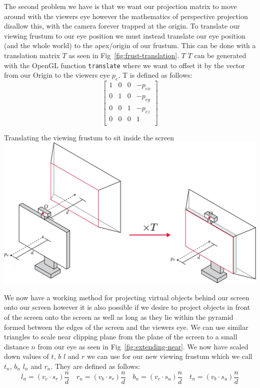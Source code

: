 The second problem we have is that we want our projection matrix to move around with the viewers eye however the mathematics of perspective projection disallow this, with the camera forever trapped at the origin. To translate our viewing frustum to our eye position we must instead translate our eye position (and the whole world) to the apex/origin of our frustum. This can be done with a translation matrix $T$ as seen in Fig~\ref{fig:frust-translation}. $T$ $T$ can be generated with the OpenGL function \texttt{translate} where we want to offset it by the vector from our Origin to the viewers eye $p_e$. T is defined as follows:
\[ 
\begin{bmatrix}
1 & 0 & 0 & -p_{ex} \\
0 & 1 & 0 & -p_{ey} \\
0 & 0 & 1 & -p_{ez} \\
0 & 0 & 0 & 1 \\
\end{bmatrix}
\]

\begin{figureBox}[label={fig:frust-translation}]{Translating the viewing frustum to sit inside the screen}
\includegraphics[width = 0.8\linewidth]{./figures/background/projection/frust-translation.pdf}
\end{figureBox}

We now have a working method for projecting virtual objects behind our screen onto our screen however it is also possible if we desire to project objects in front of the screen onto the screen as well as long as they lie within the pyramid formed between the edges of the screen and the viewers eye. We can use similar triangles to scale near clipping plane from the plane of the screen to a small distance $n$ from our eye as seen in Fig~\ref{fig:extending-near}. We now have scaled down values of $t$, $b$ $l$ and $r$ we can use for our new viewing frustum which we call $t_n$, $b_n$ $l_n$ and $r_n$. They are defined as follows: 
\[ 
l_n = (v_c \cdot s_r) \frac{n}{d} \quad r_n = (v_b \cdot s_r) \frac{n}{d} \quad b_n = (v_c \cdot s_u) \frac{n}{d} \quad t_n = (v_b \cdot s_u) \frac{n}{d} 
\]

